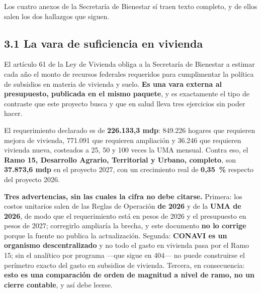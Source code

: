 Los cuatro anexos de la Secretaría de Bienestar sí traen texto completo, y de ellos salen los
dos hallazgos que siguen.

\subsection*{3.1 La vara de suficiencia en vivienda}

El artículo 61 de la Ley de Vivienda obliga a la Secretaría de Bienestar a estimar cada año
el monto de recursos federales requeridos para cumplimentar la política de subsidios en
materia de vivienda y suelo. \textbf{Es una vara externa al presupuesto, publicada en el
mismo paquete}, y es exactamente el tipo de contraste que este proyecto busca y que en salud
lleva tres ejercicios sin poder hacer.



El requerimiento declarado es de \textbf{226.133,3 mdp}: 849.226 hogares que requieren
mejora de vivienda, 771.091 que requieren ampliación y 36.246 que requieren vivienda nueva,
costeados a 25, 50 y 100 veces la UMA mensual. Contra eso, el \textbf{Ramo 15, Desarrollo
Agrario, Territorial y Urbano, completo}, son \textbf{37.873,6 mdp} en el proyecto 2027, con
un crecimiento real de \textbf{0,35~\%} respecto del proyecto 2026.


\textbf{Tres advertencias, sin las cuales la cifra no debe citarse.} Primera: los costos
unitarios salen de las Reglas de Operación \textbf{de 2026} y de la \textbf{UMA de 2026}, de
modo que el requerimiento está en pesos de 2026 y el presupuesto en pesos de 2027; corregirlo
ampliaría la brecha, y este documento \textbf{no lo corrige} porque la fuente no publica la
actualización. Segunda: \textbf{CONAVI es un organismo descentralizado} y no todo el gasto en
vivienda pasa por el Ramo 15; sin el analítico por programa ---que sigue en 404--- no puede
construirse el perímetro exacto del gasto en subsidios de vivienda. Tercera, en consecuencia:
\textbf{esto es una comparación de orden de magnitud a nivel de ramo, no un cierre contable},
y así debe leerse.

